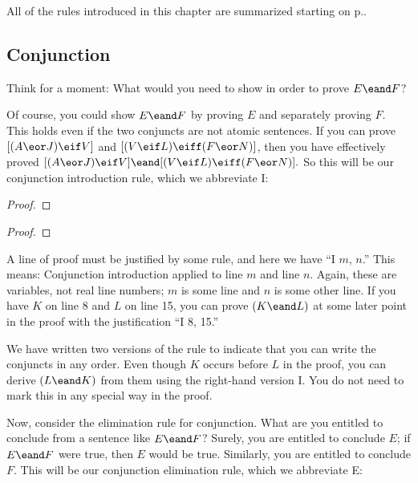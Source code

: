 All of the rules introduced in this chapter are summarized starting on p.\pageref{ProofRules}.

\subsection{Conjunction}

Think for a moment: What would you need to show in order to prove $E \eand F$?

Of course, you could show $E \eand F$ by proving $E$ and separately proving $F$. This holds even if the two conjuncts are not atomic sentences. If you can prove $[(A \eor J) \eif V]$ and  $[(V \eif L) \eiff (F \eor N)]$, then you have effectively proved $[(A \eor J) \eif V] \eand [(V \eif L) \eiff (F \eor N)].$
So this will be our conjunction introduction rule, which we abbreviate {\eand}I:

\begin{multicols}{2}

\begin{proof}
	 
\end{proof}

\begin{proof}
	 
\end{proof}

\end{multicols}

A line of proof must be justified by some rule, and here we have ``{\eand}I $m$, $n$.'' This means: Conjunction introduction applied to line $m$ and line $n$. Again, these are variables, not real line numbers; $m$ is some line and $n$ is some other line. If you have $K$ on line 8 and $L$ on line 15, you can prove $(K\eand L)$ at some later point in the proof with the justification ``{\eand}I 8, 15.'' 

We have written two versions of the rule to indicate that you can write the conjuncts in any order. Even though $K$ occurs before $L$ in the proof, you can derive $(L \eand K)$ from them using the right-hand version {\eand}I. You do not need to mark this in any special way in the proof.

Now, consider the elimination rule for conjunction. What are you entitled to conclude from a sentence like $E \eand F$? Surely, you are entitled to conclude $E$; if $E \eand F$ were true, then $E$ would be true. Similarly, you are entitled to conclude $F$. This will be our conjunction elimination rule, which we abbreviate {\eand}E:

